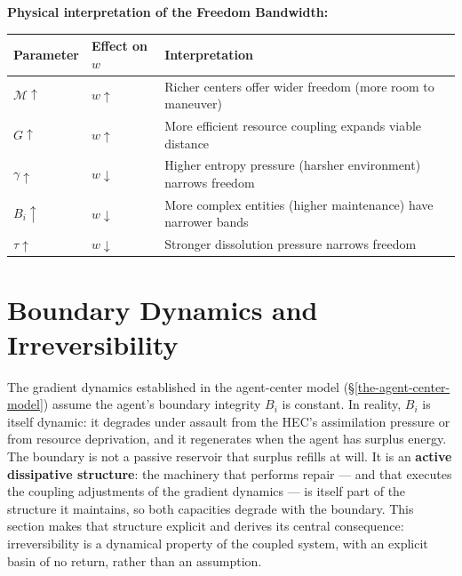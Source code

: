 \documentclass[11pt]{article}
\theoremstyle{plain}
\theoremstyle{definition}
\theoremstyle{remark}
\newcounter{none}
\let\origsection\section
\renewcommand{\section}{\needspace{12\baselineskip}\origsection}
\begin{document}
\textbf{Physical interpretation of the Freedom Bandwidth:}

{\def\LTcaptype{none} %
\begin{longtable}[]{@{}
  >{\raggedright\arraybackslash}p{}
  >{\raggedright\arraybackslash}p{}
  >{\raggedright\arraybackslash}p{}@{}}
\toprule\noalign{}
\begin{minipage}[b]{\linewidth}\raggedright
Parameter
\end{minipage} & \begin{minipage}[b]{\linewidth}\raggedright
Effect on \(w\)
\end{minipage} & \begin{minipage}[b]{\linewidth}\raggedright
Interpretation
\end{minipage} \\
\midrule\noalign{}
\endhead
\bottomrule\noalign{}
\endlastfoot
\(\mathcal{M} \uparrow\) & \(w \uparrow\) & Richer centers offer wider
freedom (more room to maneuver) \\
\(G \uparrow\) & \(w \uparrow\) & More efficient resource coupling
expands viable distance \\
\(\gamma \uparrow\) & \(w \downarrow\) & Higher entropy pressure
(harsher environment) narrows freedom \\
\(B_i \uparrow\) & \(w \downarrow\) & More complex entities (higher
maintenance) have narrower bands \\
\(\tau \uparrow\) & \(w \downarrow\) & Stronger dissolution pressure
narrows freedom \\
\end{longtable}
}

\section{Boundary Dynamics and
Irreversibility}\label{boundary-dynamics-and-irreversibility}

The gradient dynamics established in the agent-center model
(§\ref{the-agent-center-model}) assume the agent's boundary integrity
\(B_i\) is constant. In reality, \(B_i\) is itself dynamic: it degrades
under assault from the HEC's assimilation pressure or from resource
deprivation, and it regenerates when the agent has surplus energy. The
boundary is not a passive reservoir that surplus refills at will. It is
an \textbf{active dissipative structure}: the machinery that performs
repair --- and that executes the coupling adjustments of the gradient
dynamics --- is itself part of the structure it maintains, so both
capacities degrade with the boundary. This section makes that structure
explicit and derives its central consequence: irreversibility is a
dynamical property of the coupled system, with an explicit basin of no
return, rather than an assumption.
\end{document}
